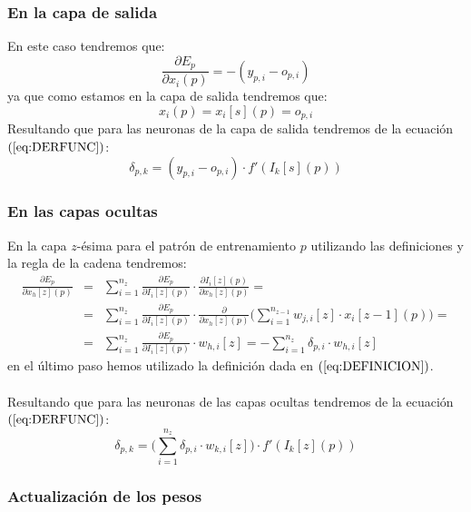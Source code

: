\subsubsection{En la capa de salida}

En este caso tendremos que:
\begin{displaymath}
\frac{\partial E_p}{\partial x_i(p)} = -(y_{p,i}-o_{p,i})
\end{displaymath}
ya que como estamos en la capa de salida tendremos que:
\begin{displaymath}
x_i(p)=x_i[s](p)=o_{p,i}
\end{displaymath}
Resultando que para las neuronas de la capa de salida tendremos de la ecuaci\'on
$(\ref{eq:DERFUNC})$:
\begin{equation}\label{eq:DeltaSalida}
\delta_{p,k} = (y_{p,i}-o_{p,i})\cdot f'(I_k[s](p))
\end{equation}
%
\newpage
%
\subsubsection{En las capas ocultas}
En la capa $z$-\'esima para el patr\'on de entrenamiento $p$ utilizando las
definiciones y la regla de la cadena tendremos:
\begin{eqnarray*}
\frac{\partial E_p}{\partial x_h[z](p)}&=& \sum_{i=1}^{n_z}
\frac{\partial E_p}{\partial I_i[z](p)}\cdot
\frac{\partial I_i[z](p)}{\partial x_h[z](p)} =\\
&=& \sum_{i=1} ^{n_z} \frac{\partial E_p}{\partial I_i[z](p)}\cdot
\frac{\partial }{\partial x_h[z](p)}\Big( \sum_{i=1}^{n_{z-1}}
w_{j,i}[z]\cdot x_i[z-1](p) \Big) =\\
&=& \sum_{i=1}^{n_z} \frac{\partial E_p}{\partial I_i[z](p)}\cdot w_{h,i}[z] =
-\sum_{i=1}^{n_z} \delta_{p,i}\cdot w_{h,i}[z]
\end{eqnarray*}
en el \'ultimo paso hemos utilizado la definici\'on dada en
$(\ref{eq:DEFINICION})$.\\ \\
%
Resultando que para las neuronas de las capas ocultas tendremos de la ecuaci\'on
$(\ref{eq:DERFUNC})$:	
\begin{equation}\label{eq:DeltaOcultas}
\delta_{p,k} = \Big( \sum_{i=1}^{n_z} \delta_{p,i}\cdot w_{k,i}[z] \Big) \cdot
f'(I_k[z](p))
\end{equation}

\subsubsection{Actualizaci\'on de los pesos}


